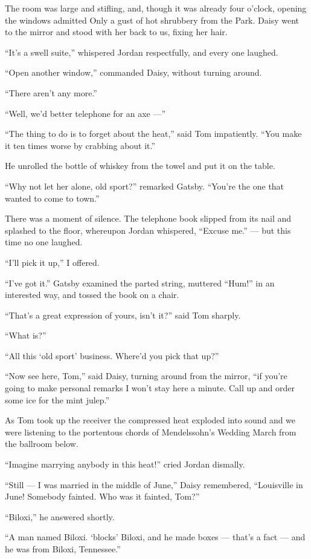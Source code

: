 \documentclass{znotebook}
\begin{document}
The room was large and stifling, and, though it was already four o'clock, opening the windows admitted Only a gust of hot shrubbery from the Park. Daisy went to the mirror and stood with her back to us, fixing her hair.

``It's a swell suite,'' whispered Jordan respectfully, and every one laughed.

``Open another window,'' commanded Daisy, without turning around.

``There aren't any more.''

``Well, we'd better telephone for an axe ---''

``The thing to do is to forget about the heat,'' said Tom impatiently. ``You make it ten times worse by crabbing about it.''

He unrolled the bottle of whiskey from the towel and put it on the table.

``Why not let her alone, old sport?'' remarked Gatsby. ``You're the one that wanted to come to town.''

There was a moment of silence. The telephone book slipped from its nail and splashed to the floor, whereupon Jordan whispered, ``Excuse me.'' ---{} but this time no one laughed.

``I'll pick it up,'' I offered.

``I've got it.'' Gatsby examined the parted string, muttered ``Hum!'' in an interested way, and tossed the book on a chair.

``That's a great expression of yours, isn't it?'' said Tom sharply.

``What is?''

``All this ‘old sport' business. Where'd you pick that up?''

``Now see here, Tom,'' said Daisy, turning around from the mirror, ``if you're going to make personal remarks I won't stay here a minute. Call up and order some ice for the mint julep.''

As Tom took up the receiver the compressed heat exploded into sound and we were listening to the portentous chords of Mendelssohn's Wedding March from the ballroom below.

``Imagine marrying anybody in this heat!'' cried Jordan dismally.

``Still ---{} I was married in the middle of June,'' Daisy remembered, ``Louisville in June! Somebody fainted. Who was it fainted, Tom?''

``Biloxi,'' he answered shortly.

``A man named Biloxi. ‘blocks' Biloxi, and he made boxes ---{} that's a fact ---{} and he was from Biloxi, Tennessee.''
\end{document}
